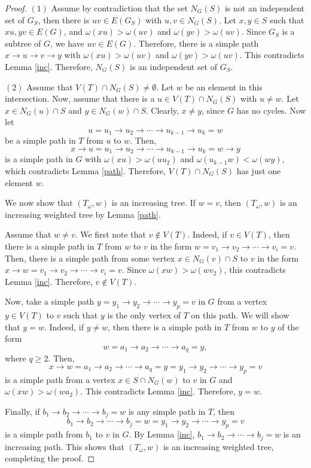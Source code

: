 \documentclass[12pt,amscd]{amsart}
\theoremstyle{definition}
\begin{document}
\begin{proof} $(1)$ Assume by contradiction that the set $N_G(S)$ is not an independent set of $G_S$, then  there is $uv\in E(G_S)$ with $u,v\in N_G(S)$. Let $x,y\in S$ such that $xu,yv\in E(G)$, and $\omega(xu) > \omega(uv)$ and $\omega(yv) > \omega(uv)$. Since $G_S$ is a subtree of $G$, we have  $uv\in E(G)$. Therefore, there is a simple path $x\to u\to v\to y$ with $\omega(xu) > \omega(uv)$ and $\omega(yv) > \omega(uv)$. This contradicts Lemma \ref{inc}.  Therefore,  $N_G(S)$ is an independent set of $G_S$.

$(2)$ Assume that $V(T)\cap N_G(S)\ne \emptyset$. Let $w$ be an element in this intersection. Now, assume that there is a $u\in V(T)\cap N_G(S)$ with $u\ne w$. Let $x\in N_G(u)\cap S$ and $y\in N_G(w)\cap S$. Clearly, $x\ne y$, since $G$ has no cycles. Now let
$$u=u_1\to u_2\to\cdots\to u_{k-1}\to u_k=w$$
be a simple  path in $T$ from $u$ to $w$. Then,
$$x\to u=u_1\to u_2\to\cdots\to u_{k-1}\to u_k=w\to y$$
is a simple path in $G$ with $\omega(xu) > \omega(uu_2)$ and $\omega(u_{k-1}w) < \omega(wy)$, which contradicts Lemma \ref{path}. Therefore, $V(T)\cap N_G(S)$ has just one element $w$.

We now show that $(T_\omega,w)$ is an increasing tree. If $w=v$, then $(T_\omega,w)$ is an increasing weighted tree by Lemma \ref{path}.

Assume that $w\ne v$. We first note that $v\notin V(T)$. Indeed, if $v\in V(T)$, then there is a simple path in $T$ from $w$ to $v$ in the form $w=v_1\to v_2\to \cdots \to v_i = v$. Then, there is a simple path  from some vertex $x\in N_G(v) \cap S$ to $v$   in the form
$x\to w=v_1\to v_2\to \cdots \to v_i =v$. Since $\omega(xw) > \omega(wv_2)$, this contradicts Lemma \ref{inc}.  Therefore,  $v\notin V(T)$.

Now, take a simple path $y= y_1\to y_2\to \cdots \to y_p =v$ in $G$ from a vertex $y\in V(T)$ to $v$ such that $y$ is the only vertex of $T$  on this path. We will show that $y =w$. Indeed, if $y\ne w$, then there is a simple path in $T$ from $w$ to $y$ of the form
$$w= a_1\to a_2\to\cdots \to a_q=y,$$
where $q\geqslant 2$. Then,
$$x\to w=a_1\to a_2\to\cdots \to a_q=y= y_1\to y_2\to \cdots \to y_p =v$$
is a simple path from a vertex $x\in S\cap N_G(w)$ to $v$ in $G$ and  $\omega(xw) > \omega(wa_2)$. This contradicts Lemma \ref{inc}. Therefore, $y=w$.

Finally, if $b_1\to b_2\to\cdots\to b_j=w$ is  any simple path in $T$, then
$$b_1\to b_2\to\cdots\to b_j=w=y_1\to y_2\to \cdots \to y_p =v$$
is a simple path from $b_1$ to $v$ in $G$. By Lemma \ref{inc},
$b_1\to b_2\to\cdots\to b_j=w$
is an increasing path. This shows that $(T_\omega,w)$ is an increasing weighted tree, completing the proof.
\end{proof}
\end{document}
